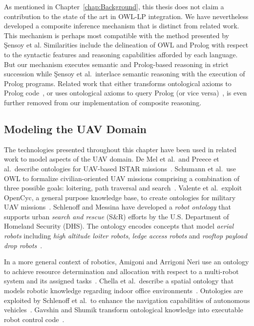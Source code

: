 As mentioned in Chapter~\ref{chap:Background}, this thesis does not claim a contribution to the state of the art in OWL-LP integration. We have nevertheless developed a composite inference mechanism that is distinct from related work. This mechanism is perhaps most compatible with the method presented by \c{S}ensoy et al. Similarities include the delineation of OWL and Prolog with respect to the syntactic features and reasoning capabilities afforded by each language. But our mechanism executes semantic and Prolog-based reasoning in strict succession while \c{S}ensoy et al.\ interlace semantic reasoning with the execution of Prolog programs. Related work that either transforms ontological axioms to Prolog code~\cite{Papadakis_2011,Samuel_2008,Lukacsy_2009a}, or uses ontological axioms to query Prolog (or vice versa)~\cite{Almendros_Jimenez_2011,Elenius_2012}, is even further removed from our implementation of composite reasoning.

\subsection{Modeling the UAV Domain}

The technologies presented throughout this chapter have been used in related work to model aspects of the UAV domain. De Mel et al.\ and Preece et al.\ describe ontologies for UAV-based ISTAR missions~\cite{De_Mel_2013,Preece_2008}. Schumann et al.\ use OWL to formalize civilian-oriented UAV missions comprising a combination of three possible goals: loitering, path traversal and search~\cite{Ferraro_2012}. Valente et al.\ exploit OpenCyc, a general purpose knowledge base, to create ontologies for military UAV missions~\cite{Valente_2005}. Schlenoff and Messina have developed a \emph{robot ontology} that supports urban \emph{search and rescue} (S\&R) efforts by the U.S. Department of Homeland Security (DHS). The ontology encodes concepts that model \emph{aerial robots} including \emph{high altitude loiter robots}, \emph{ledge access robots} and \emph{rooftop payload drop robots}~\cite{Schlenoff_2005}.

In a more general context of robotics, Amigoni and Arrigoni Neri use an ontology to achieve resource determination and allocation with respect to a multi-robot system and its assigned tasks~\cite{Amigoni_2005}. Chella et al.\ describe a spatial ontology that models robotic knowledge regarding indoor office environments~\cite{Chella_2002}. Ontologies are exploited by Schlenoff et al.\ to enhance the navigation capabilities of autonomous vehicles~\cite{Schlenoff_2003}. Gavshin and Shumik transform ontological knowledge into executable robot control code~\cite{Gavshin_2011}.

